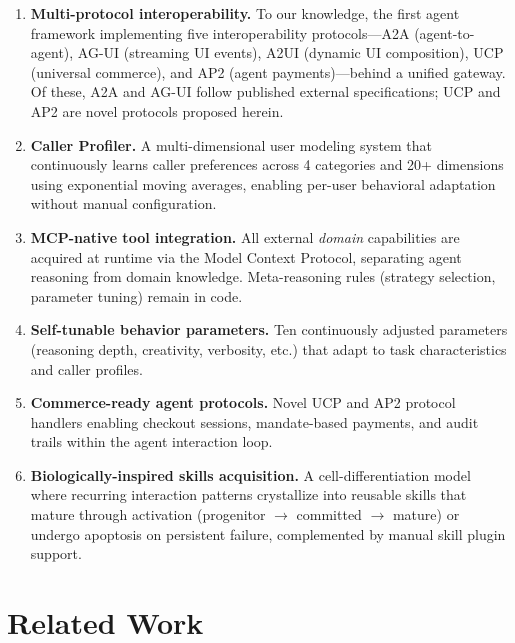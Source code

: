 \documentclass{article}
\begin{document}
\begin{enumerate}
\item \textbf{Multi-protocol interoperability.} To our knowledge, the first agent framework implementing five interoperability protocols---A2A (agent-to-agent), AG-UI (streaming UI events), A2UI (dynamic UI composition), UCP (universal commerce), and AP2 (agent payments)---behind a unified gateway. Of these, A2A and AG-UI follow published external specifications; UCP and AP2 are novel protocols proposed herein.

\item \textbf{Caller Profiler.} A multi-dimensional user modeling system that continuously learns caller preferences across 4 categories and 20+ dimensions using exponential moving averages, enabling per-user behavioral adaptation without manual configuration.

\item \textbf{MCP-native tool integration.} All external \emph{domain} capabilities are acquired at runtime via the Model Context Protocol, separating agent reasoning from domain knowledge. Meta-reasoning rules (strategy selection, parameter tuning) remain in code.

\item \textbf{Self-tunable behavior parameters.} Ten continuously adjusted parameters (reasoning depth, creativity, verbosity, etc.) that adapt to task characteristics and caller profiles.

\item \textbf{Commerce-ready agent protocols.} Novel UCP and AP2 protocol handlers enabling checkout sessions, mandate-based payments, and audit trails within the agent interaction loop.

\item \textbf{Biologically-inspired skills acquisition.} A cell-differentiation model where recurring interaction patterns crystallize into reusable skills that mature through activation (progenitor $\to$ committed $\to$ mature) or undergo apoptosis on persistent failure, complemented by manual skill plugin support.
\end{enumerate}

\section{Related Work}
\label{sec:related}
\end{document}
